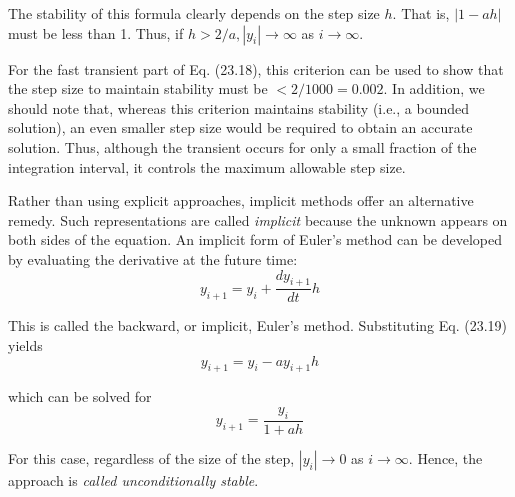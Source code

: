 \documentclass[../main.tex]{subfiles}
\begin{document}
\noindent The stability of this formula clearly depends on the step size $h$. That is, $|1-a h|$ must be less than 1. Thus, if $h>2 / a,\left|y_{i}\right| \rightarrow \infty$ as $i \rightarrow \infty$.

For the fast transient part of Eq. (23.18), this criterion can be used to show that the step size to maintain stability must be $<2 / 1000=0.002$. In addition, we should note that, whereas this criterion maintains stability (i.e., a bounded solution), an even smaller step size would be required to obtain an accurate solution. Thus, although the transient occurs for only a small fraction of the integration interval, it controls the maximum allowable step size.

Rather than using explicit approaches, implicit methods offer an alternative remedy. Such representations are called \textit{implicit} because the unknown appears on both sides of the equation. An implicit form of Euler's method can be developed by evaluating the derivative at the future time:
\begin{equation}
    y_{i+1}=y_{i}+\frac{d y_{i+1}}{d t} h \nonumber
\end{equation}

\noindent This is called the backward, or implicit, Euler's method. Substituting Eq. (23.19) yields
\begin{equation}
    y_{i+1}=y_{i}-a y_{i+1} h \nonumber
\end{equation}

\noindent which can be solved for
\begin{equation}
    \tag{23.21}
    y_{i+1}=\frac{y_{i}}{1+a h}
\end{equation}

\noindent For this case, regardless of the size of the step, $\left|y_{i}\right| \rightarrow 0$ as $i \rightarrow \infty$. Hence, the approach is \textit{called unconditionally stable}.
\end{document}
